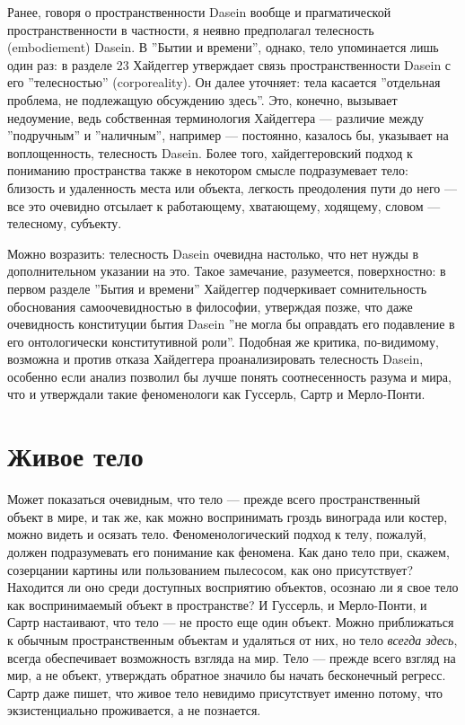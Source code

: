 \documentclass[11pt]{book}
\begin{document}
Ранее, говоря о пространственности Dasein вообще и прагматической пространственности в частности, я неявно предполагал телесность (embodiement) Dasein. В ''Бытии и времени'', однако, тело упоминается лишь один раз: в разделе 23 Хайдеггер утверждает связь пространственности Dasein с его ''телесностью'' (corporeality). Он далее уточняет: тела касается ''отдельная проблема, не подлежащую обсуждению здесь''. Это, конечно, вызывает недоумение, ведь собственная терминология Хайдеггера --- различие между ''подручным'' и ''наличным'', например --- постоянно, казалось бы, указывает на воплощенность, телесность Dasein. Более того, хайдеггеровский подход к пониманию пространства также в некотором смысле подразумевает тело: близость и удаленность места или объекта, легкость преодоления пути до него --- все это очевидно отсылает к работающему, хватающему, ходящему, словом --- телесному, субъекту.

Можно возразить: телесность Dasein очевидна настолько, что нет нужды в дополнительном указании на это. Такое замечание, разумеется, поверхностно: в первом разделе ''Бытия и времени'' Хайдеггер подчеркивает сомнительность обоснования самоочевидностью в философии, утверждая позже, что даже очевидность конституции бытия Dasein ''не могла бы оправдать его подавление в его онтологически конститутивной роли''. Подобная же критика, по-видимому, возможна и против отказа Хайдеггера проанализировать телесность Dasein, особенно если анализ позволил бы лучше понять соотнесенность разума и мира, что и утверждали такие феноменологи как Гуссерль, Сартр и Мерло-Понти.

\section{Живое тело}

Может показаться очевидным, что тело --- прежде всего пространственный объект в мире, и так же, как можно воспринимать гроздь винограда или костер, можно видеть и осязать тело. Феноменологический подход к телу, пожалуй, должен подразумевать его понимание как феномена. Как дано тело при, скажем, созерцании картины или пользованием пылесосом, как оно присутствует? Находится ли оно среди доступных восприятию объектов, осознаю ли я свое тело как воспринимаемый объект в пространстве? И Гуссерль, и Мерло-Понти, и Сартр настаивают, что тело --- не просто еще один объект. Можно приближаться к обычным пространственным объектам и удаляться от них, но тело \textit{всегда здесь}, всегда обеспечивает возможность взгляда на мир. Тело --- прежде всего взгляд на мир, а не объект, утверждать обратное значило бы начать бесконечный регресс. Сартр даже пишет, что живое тело невидимо присутствует именно потому, что экзистенциально проживается, а не познается.
\end{document}
